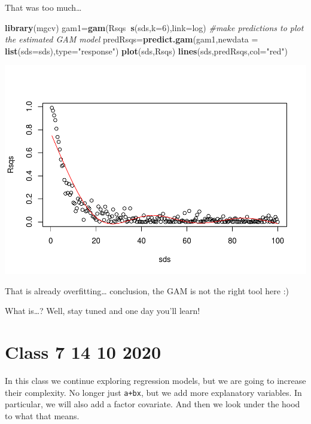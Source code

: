 \documentclass[
]{book}
\newenvironment{Shaded}{\begin{snugshade}}{\end{snugshade}}
\newcommand{\CommentTok}[1]{\textcolor[rgb]{0.56,0.35,0.01}{\textit{#1}}}
\newcommand{\DataTypeTok}[1]{\textcolor[rgb]{0.13,0.29,0.53}{#1}}
\newcommand{\DecValTok}[1]{\textcolor[rgb]{0.00,0.00,0.81}{#1}}
\newcommand{\KeywordTok}[1]{\textcolor[rgb]{0.13,0.29,0.53}{\textbf{#1}}}
\newcommand{\NormalTok}[1]{#1}
\newcommand{\OperatorTok}[1]{\textcolor[rgb]{0.81,0.36,0.00}{\textbf{#1}}}
\newcommand{\StringTok}[1]{\textcolor[rgb]{0.31,0.60,0.02}{#1}}
\begin{document}
That was too much\ldots{}

\begin{Shaded}
\begin{Highlighting}[]
\KeywordTok{library}\NormalTok{(mgcv)}
\NormalTok{gam1=}\KeywordTok{gam}\NormalTok{(Rsqs}\OperatorTok{~}\KeywordTok{s}\NormalTok{(sds,}\DataTypeTok{k=}\DecValTok{6}\NormalTok{),}\DataTypeTok{link=}\NormalTok{log)}
\CommentTok{#make predictions to plot the estimated GAM model}
\NormalTok{predRsqs=}\KeywordTok{predict.gam}\NormalTok{(gam1,}\DataTypeTok{newdata =} \KeywordTok{list}\NormalTok{(}\DataTypeTok{sds=}\NormalTok{sds),}\DataTypeTok{type=}\StringTok{"response"}\NormalTok{)}
\KeywordTok{plot}\NormalTok{(sds,Rsqs)}
\KeywordTok{lines}\NormalTok{(sds,predRsqs,}\DataTypeTok{col=}\StringTok{"red"}\NormalTok{)}
\end{Highlighting}
\end{Shaded}

\includegraphics{ECOMODbook_files/figure-latex/a6.34-1.pdf}

That is already overfitting\ldots{} conclusion, the GAM is not the right tool here :)

What is\ldots? Well, stay tuned and one day you'll learn!

\hypertarget{aula7}{%
\chapter{Class 7 14 10 2020}\label{aula7}}

In this class we continue exploring regression models, but we are going to increase their complexity. No longer just \texttt{a+bx}, but we add more explanatory variables. In particular, we will also add a factor covariate. And then we look under the hood to what that means.
\end{document}
